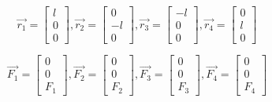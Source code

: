 \documentclass{article}
\begin{document}

\begin{equation}
\overrightarrow{r_1} = \left[\begin{array}{c} l \\ 0 \\ 0\end{array}\right],
\overrightarrow{r_2} = \left[\begin{array}{c} 0 \\ -l \\ 0\end{array}\right],
\overrightarrow{r_3} = \left[\begin{array}{c} -l \\ 0 \\ 0\end{array}\right],
\overrightarrow{r_4} = \left[\begin{array}{c} 0 \\ l \\ 0\end{array}\right]
\end{equation}

\begin{equation}
\overrightarrow{F_1} = \left[\begin{array}{c} 0 \\ 0 \\ F_1 \end{array}\right],
\overrightarrow{F_2} = \left[\begin{array}{c} 0 \\ 0 \\ F_2 \end{array}\right],
\overrightarrow{F_3} = \left[\begin{array}{c} 0 \\ 0 \\ F_3 \end{array}\right],
\overrightarrow{F_4} = \left[\begin{array}{c} 0 \\ 0 \\ F_4 \end{array}\right]
\end{equation}
\end{document}
